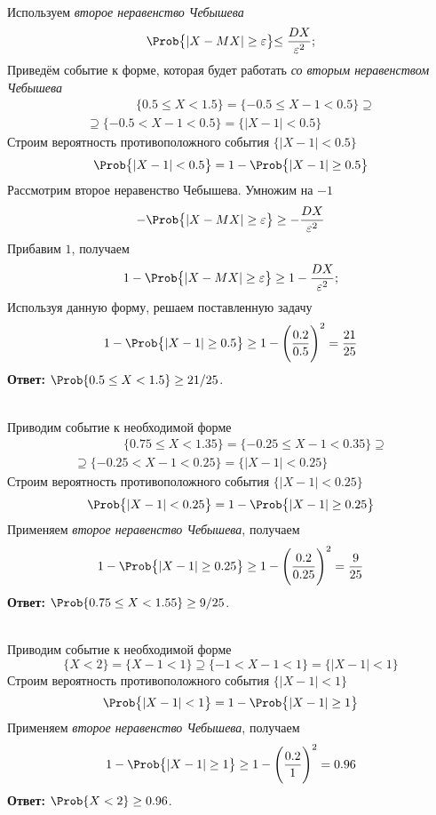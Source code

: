 \begin{slv}[$\{ 0.5 \leq X < 1.5 \}$]\hfill\\
	Используем \textit{второе неравенство Чебышева}
	\[
		\Prob\bigl\{ | X - MX | \geq \varepsilon \bigl\} \leq \frac{DX}{\varepsilon^2};
	\]
	Приведём событие к форме, которая будет работать \textit{со вторым неравенством Чебышева}
	\begin{multline*}
		\qquad\qquad\{ 0.5 \leq X < 1.5 \} = \{ -0.5 \leq X - 1 < 0.5 \} \supseteq \\
		\supseteq \{ -0.5 < X - 1 < 0.5 \} = \bigl\{ |X - 1| < 0.5 \bigr\}\qquad\qquad
	\end{multline*}
	Строим вероятность противоположного события $\bigl\{ |X - 1| < 0.5 \bigr\}$
	\[
		\Prob \bigl\{ |X - 1| < 0.5 \bigr\} = 1 - \Prob \bigl\{ |X - 1| \geq 0.5 \bigr\}
	\]
	Рассмотрим второе неравенство Чебышева. Умножим на $-1$
	\[
		- \Prob\bigl\{ | X - MX | \geq \varepsilon \bigr\} \geq - \frac{DX}{\varepsilon^2}
	\]
	Прибавим $1$, получаем
	\begin{equation}
		1 - \Prob\bigl\{ | X - MX | \geq \varepsilon \bigr\} \geq 1 - \frac{DX}{\varepsilon^2};
	\end{equation}
	Используя данную форму, решаем поставленную задачу
	\[
		1 - \Prob \bigl\{ |X - 1| \geq 0.5 \bigr\} \geq 1 - \Biggl(\frac{0.2}{0.5}\Biggr)^2 = \frac{21}{25}
	\]
	\textbf{Ответ:} $\Prob \{ 0.5 \leq X < 1.5 \} \geq 21/25$.
\end{slv}

\begin{slv}[$\{ 0.75 \leq X < 1.55 \}$]\hfill\\
	Приводим событие к необходимой форме 
	\begin{multline*}
		\qquad\qquad\{ 0.75 \leq X < 1.35 \} = \{ -0.25 \leq X - 1 < 0.35 \} \supseteq \\
		\supseteq \{ -0.25 < X - 1 < 0.25 \} = \bigl\{ |X - 1| < 0.25 \bigr\}\qquad\qquad
	\end{multline*}
	Строим вероятность противоположного события $\bigl\{ |X - 1| < 0.25 \bigr\}$
	\[
		\Prob \bigl\{ |X - 1| < 0.25 \bigr\} = 1 - \Prob \bigl\{ |X - 1| \geq 0.25 \bigr\}
	\]
	Применяем \textit{второе неравенство Чебышева}, получаем
	\[
		1 - \Prob \bigl\{ |X - 1| \geq 0.25 \bigr\} \geq 1 - \Biggl(\frac{0.2}{0.25}\Biggr)^2 = \frac{9}{25} 
	\]
	\textbf{Ответ:} $\Prob \{ 0.75 \leq X < 1.55 \} \geq 9/25$.
\end{slv}

\begin{slv}[$\{ X < 2 \}$]\hfill\\
	Приводим событие к необходимой форме 
	\[
		\{ X < 2 \} = \{ X - 1 < 1 \} \supseteq \{ -1 < X - 1 < 1 \} = \bigl\{ |X - 1| < 1 \bigr\}
	\]
	Строим вероятность противоположного события $\bigl\{ |X - 1| < 1 \bigr\}$
	\[
		\Prob \bigl\{ |X - 1| < 1 \bigr\} = 1 - \Prob \bigl\{ |X - 1| \geq 1 \bigr\}
	\]
	Применяем \textit{второе неравенство Чебышева}, получаем
	\[
		1 - \Prob \bigl\{ |X - 1| \geq 1 \bigr\} \geq 1 - \Biggl(\frac{0.2}{1}\Biggr)^2 = 0.96
	\]
	\textbf{Ответ:} $\Prob \{ X < 2 \} \geq 0.96$.
\end{slv}

